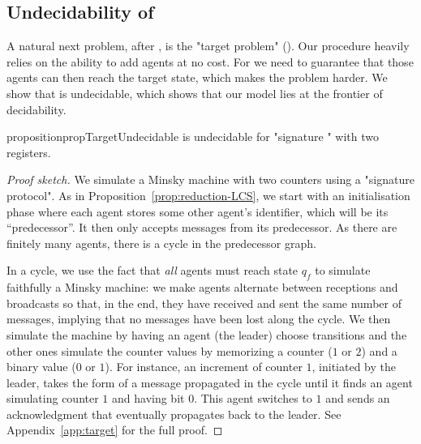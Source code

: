 \subsection{Undecidability of \TARGET}
\label{sec:undec-target}

A natural next problem, after \COVER, is the "target problem" (\TARGET).  
Our \COVER procedure heavily relies on the ability to add agents at no cost. For \TARGET we need to guarantee that those agents can then reach the target state, which makes the problem harder. 
We show that \TARGET is undecidable, which shows that our model lies at the frontier of decidability. 

\begin{restatable}{proposition}{propTargetUndecidable}
\label{prop:target-undec}
\TARGET is undecidable for "signature \BNRA" with two registers.
\end{restatable}

\begin{proof}[Proof sketch]
We simulate a Minsky machine with two counters using a "signature protocol". As in Proposition~\ref{prop:reduction-LCS},  we start with an initialisation phase where each agent stores some other agent's identifier, which will be its ``predecessor''. It then only accepts messages from its predecessor. As there are finitely many agents, there is a cycle in the predecessor graph. 

In a cycle, we use the fact that \emph{all} agents must reach state $q_f$ to simulate faithfully a Minsky machine: we make agents alternate between receptions and broadcasts so that, in the end, they have received and sent the same number of messages, implying that no messages have been lost along the cycle.
We then simulate the machine by having an agent (the leader) choose transitions and the other ones simulate the counter values by memorizing a counter ($1$ or $2$) and a binary value ($0$ or $1$). For instance, an increment of counter $1$, initiated by the leader, takes the form of a message propagated in the cycle until it finds an agent simulating counter $1$ and having bit $0$. This agent switches to $1$ and sends an acknowledgment that eventually propagates back to the leader. See Appendix~\ref{app:target} for the full proof. 
\end{proof}
